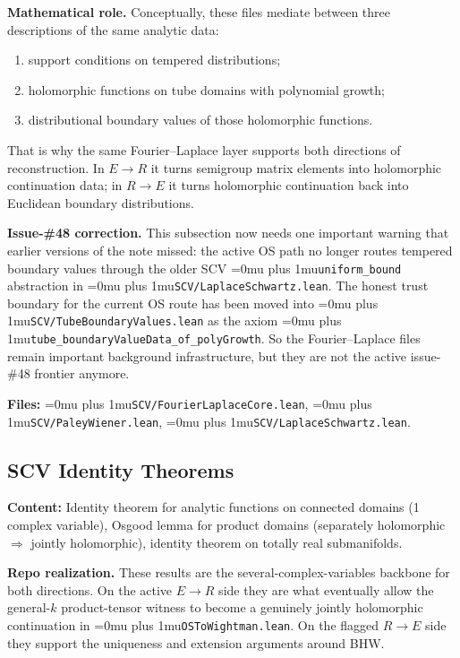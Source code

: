\documentclass[11pt,a4paper]{article}
\newcommand{\leanfile}[1]{\begingroup\Urlmuskip=0mu plus 1mu\relax\nolinkurl{#1}\endgroup}
\newcommand{\leanname}[1]{\begingroup\Urlmuskip=0mu plus 1mu\relax\nolinkurl{#1}\endgroup}
\begin{document}
\medskip\noindent
\textbf{Mathematical role.}
Conceptually, these files mediate between three descriptions of the same
analytic data:
\begin{enumerate}
\item support conditions on tempered distributions;
\item holomorphic functions on tube domains with polynomial growth;
\item distributional boundary values of those holomorphic functions.
\end{enumerate}
That is why the same Fourier--Laplace layer supports both directions of
reconstruction. In $E \to R$ it turns semigroup matrix elements into
holomorphic continuation data; in $R \to E$ it turns holomorphic continuation
back into Euclidean boundary distributions.

\medskip\noindent
\textbf{Issue-\#48 correction.}
This subsection now needs one important warning that earlier versions of the
note missed: the active OS path no longer routes tempered boundary values
through the older SCV \leanname{uniform\_bound} abstraction in
\leanfile{SCV/LaplaceSchwartz.lean}. The honest trust boundary for the current
OS route has been moved into \leanfile{SCV/TubeBoundaryValues.lean} as the axiom
\leanname{tube\_boundaryValueData\_of\_polyGrowth}. So the Fourier--Laplace files
remain important background infrastructure, but they are not the active
issue-\#48 frontier anymore.

\textbf{Files:} \leanname{SCV/FourierLaplaceCore.lean},
\leanname{SCV/PaleyWiener.lean}, \leanname{SCV/LaplaceSchwartz.lean}.

\subsection{SCV Identity Theorems}

\textbf{Content:} Identity theorem for analytic functions on connected
domains (1 complex variable), Osgood lemma for product domains
(separately holomorphic $\Rightarrow$ jointly holomorphic), identity
theorem on totally real submanifolds.

\medskip\noindent
\textbf{Repo realization.}
These results are the several-complex-variables backbone for both directions.
On the active $E \to R$ side they are what eventually allow the general-$k$
product-tensor witness to become a genuinely jointly holomorphic continuation in
\leanfile{OSToWightman.lean}. On the flagged $R \to E$ side they support the
uniqueness and extension arguments around BHW.
\end{document}
